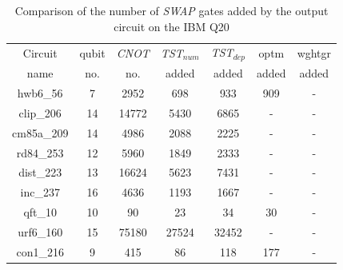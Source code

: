 \documentclass[runningheads]{llncs}
\begin{document}
				\begin{table}[H]
					\label{tab5}
					\begin{center}  
					\begin{tabular}{|c|c|c|c|c|c|c|}
					\hline
					Circuit &  qubit  & \textit{CNOT} &\textit{TST$_{num}$}& \textit{TST$_{dep}$}  & optm 	 & wghtgr 	\\
					 name	&   no. 	&	no. & added&  added &  added 	&  added\\
					\hline
					hwb6\_56 & 7 & 2952 & 698 & 933 & 909 & - \\ 
clip\_206 & 14 & 14772 & 5430 & 6865 & - & - \\ 
cm85a\_209 & 14 & 4986 & 2088 & 2225 & - & - \\ 
rd84\_253 & 12 & 5960 & 1849 & 2333 & - & - \\ 
dist\_223 & 13 & 16624 & 5623 & 7431 & - & - \\ 
inc\_237 & 16 & 4636 & 1193 & 1667 & - & - \\ 
qft\_10 & 10 & 90 & 23 & 34 & 30 & - \\ 
urf6\_160 & 15 & 75180 & 27524 & 32452 & - & - \\ 
con1\_216 & 9 & 415 & 86 & 118 & 177 & - \\ 
					\hline
					\end{tabular} 
					\end{center}	
					\caption{Comparison of  the number of  \textit{SWAP} gates added by the 
					output circuit on the IBM Q20 }  
					\label{tab5}
					\end{table}
\end{document}
